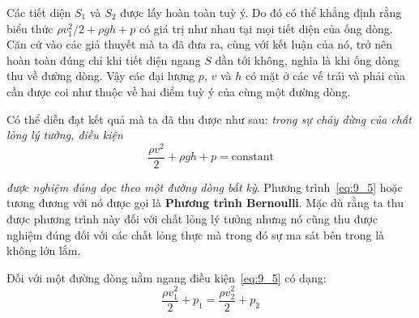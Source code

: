 \noindent

Các tiết diện $S_1$ và $S_2$ được lấy hoàn toàn tuỳ ý. Do đó có thể khẳng định rằng biểu thức $\rho v_1^2/2+\rho gh+p$ có giá trị như nhau tại mọi tiết diện của ống dòng. Căn cứ vào các giả thuyết mà ta đã đưa ra, cùng với kết luận của nó,  trở nên hoàn toàn đúng chỉ khi tiết diện ngang $S$ dần tới không, nghĩa là khi ống dòng thu về đường dòng. Vậy các đại lượng $p$, $v$ và $h$ có mặt ở các vế trái và phải của  cần được coi như thuộc về hai điểm tuỳ ý của cùng một đường dòng.


Có thể diễn đạt kết quả mà ta đã thu được như sau: \textit{trong sự chảy dừng của chất lỏng lý tưởng, điều kiện}
\begin{equation}\label{eq:9_5}
	\frac{\rho v^2}{2} + \rho gh + p = \text{constant}
\end{equation}

\noindent

\textit{được nghiệm đúng dọc theo một đường dòng bất kỳ}. Phương trình~\eqref{eq:9_5} hoặc  tương đương với nó được gọi là \textbf{Phương trình Bernoulli}. Mặc dù rằng ta thu được phương trình này đối với chất lỏng lý tưởng nhưng nó cũng thu được nghiệm đúng đối với các chất lỏng thực mà trong đó sự ma sát bên trong là không lớn lắm.


Đối với một đường dòng nằm ngang điều kiện~\eqref{eq:9_5} có dạng:
\begin{equation*}
	\frac{\rho v_1^2}{2} + p_1 = \frac{\rho v_2^2}{2} + p_2
\end{equation*}

